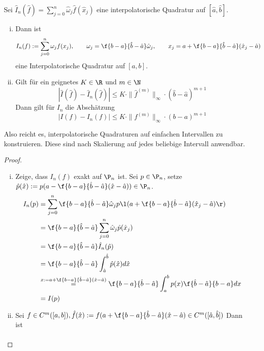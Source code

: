 \documentclass[11pt]{scrbook}
\begin{document}
\begin{st}[Koordinatentransformation]
	\label{2.8}
	Sei $\hat I_n(\hat f) = \sum_{j=0}^n \hat \omega_j \hat f(\hat x_j)$ eine interpolatorische Quadratur auf $[\hat a, \hat b]$.
	\begin{enumerate}[i)]
		\item
			Dann ist
			\[
				I_n(f) := \sum_{j=0}^n \omega_j f(x_j), \qquad \omega_j = \f{b-a}{\hat b - \hat a}\hat \omega_j, \qquad x_j =a + \f{b-a}{\hat b - \hat a}(\hat x_j - \hat a)
			\]
			eine Interpolatorische Quadratur auf $[a,b]$.
		\item
			Gilt für ein geignetes $K\in \R$ und $m \in \N$
			\[
				|\hat I(\hat f) - \hat I_n(\hat f) | \le K \cdot \|\hat f^{(m)}\|_\infty \cdot (\hat b - \hat a)^{m+1}
			\]
			Dann gilt für $I_n$ die Abschätzung
			\[
				|I(f) - I_n(f)| \le K \cdot \|f^{(m)}\|_\infty \cdot (b-a)^{m+1}
			\]
	\end{enumerate}
	\begin{note}
		Also reicht es, interpolatorische Quadraturen auf einfachen Intervallen zu konstruieren.
		Diese sind nach Skalierung auf jedes beliebige Intervall anwendbar.
	\end{note}
	\begin{proof}
		\begin{enumerate}[i)]
			\item
				Zeige, dass $I_n(f)$ exakt auf $\P_n$ ist.
				Sei $p\in \P_n$, setze $\hat p(\hat x) := p(a- \f {b-a}{\hat b- \hat a}(\hat x- \hat a)) \in \P_n$.
				\begin{align*}
					I_n(p) 
					&= \sum_{j=0}^{n} \f {b-a}{\hat b - \hat a} \hat \omega_j p\l(a + \f {b-a}{\hat b - \hat a}(\hat x_j - \hat a)\r) \\
					&=\f {b-a}{\hat b - \hat a}\sum_{j=0}^n \hat \omega_j \hat p(\hat x_j) \\
					&= \f {b-a}{\hat b - \hat a}\hat I_n(\hat p) \\
					&= \f {b-a}{\hat b - \hat a}\int_{\hat a}^{\hat b}\hat p(\hat x) d\hat x \\
					&\stackrel{x:= a+ \f{b-a}{\hat b - \hat a}(\hat x - \hat a)} = \f {b-a}{\hat b - \hat a} \int_a^b p(x) \f {\hat b - \hat a}{b-a} dx \\
					&= I(p)
				\end{align*}
			\item
				Sei $f\in C^m([a,b]), \hat f(\hat x) := f(a + \f {b-a}{\hat b - \hat a}(\hat x - \hat a) \in C^m([\hat a,\hat b])$
				Dann ist
				\begin{align*}

\end{align*}
\end{enumerate}
\end{proof}
\end{st}
\end{document}
